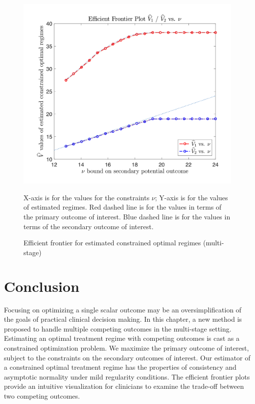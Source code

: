 \documentclass{article}
\begin{document}
\begin{figure}[H]
	\centering
\includegraphics[width=0.9\linewidth]{./figs/efficient_plot.png}
\caption{Efficient frontier for estimated constrained optimal regimes (multi-stage)}
\justify
X-axis is for the values for the constraints $\nu$; Y-axis is for the values of estimated regimes. Red dashed line is for the values in terms of the primary outcome of interest. Blue dashed line is for the values in terms of the secondary outcome of interest.
\end{figure}


\section{Conclusion}
Focusing on optimizing a single scalar outcome may be an oversimplification of the goals of practical clinical decision making. In this chapter, a new method is proposed to handle multiple competing outcomes in the multi-stage setting. Estimating an optimal treatment regime with competing outcomes is cast as a constrained optimization problem. We maximize the primary outcome of interest, subject to the constraints on the secondary outcomes of interest. Our estimator of a constrained optimal treatment regime has the properties of consistency and asymptotic normality under mild regularity conditions. The efficient frontier plots provide an intuitive visualization for clinicians to examine the trade-off between two competing outcomes. 

{}

\end{document}
